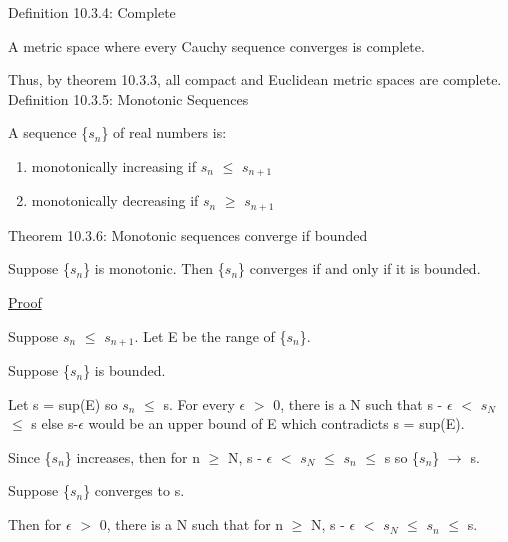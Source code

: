 { \color{blue} Definition 10.3.4: Complete } 

	\begin{adjustbox}{minipage=14cm, right, vspace=0.1cm 0cm}
		A metric space where every Cauchy sequence converges is complete.

		Thus, by {\color{red} theorem 10.3.3}, all compact and Euclidean
		metric spaces are complete. \\
	\end{adjustbox}

{ \color{blue} Definition 10.3.5: Monotonic Sequences } 

	\begin{adjustbox}{minipage=14cm, right, vspace=0.1cm 0cm}
		A sequence \{$s_n$\} of real numbers is:
	\end{adjustbox}

	\begin{enumerate}[label=(\alph*), leftmargin=2cm, itemsep=0.1cm]
		\item monotonically increasing if $s_n$ $\leq$ $s_{n+1}$
		
		\item monotonically decreasing if $s_n$ $\geq$ $s_{n+1}$ \\
	\end{enumerate}

{ \color{red} Theorem 10.3.6: Monotonic sequences converge if bounded } 

	\begin{adjustbox}{minipage=14cm, right, vspace=0.1cm 0cm}
		Suppose \{$s_n$\} is monotonic. Then \{$s_n$\} converges if
		and only if it is bounded.
	\end{adjustbox}

{ \color{magenta} \underline{Proof} } 

	Suppose $s_n$ $\leq$ $s_{n+1}$.
	Let E be the range of \{$s_n$\}.
	
	Suppose \{$s_n$\} is bounded.
	
	Let s = sup(E) so $s_n$ $\leq$ s.
	For every $\epsilon$ $>$ 0, there is a N such that
	s - $\epsilon$ $<$ $s_N$ $\leq$ s
	else s-$\epsilon$ would be an upper bound of E
	which contradicts s = sup(E).

	Since \{$s_n$\} increases, then for n $\geq$ N,
	s - $\epsilon$ $<$ $s_N$ $\leq$ $s_n$ $\leq$ s
	so \{$s_n$\} $\rightarrow$ s.

	Suppose \{$s_n$\} converges to s.

	Then for $\epsilon$ $>$ 0, there is a N such that for n $\geq$ N,
	s - $\epsilon$ $<$ $s_N$ $\leq$ $s_n$ $\leq$ s.

